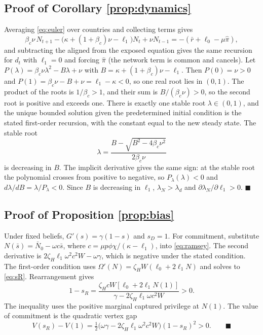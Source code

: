 \documentclass[11pt]{article}
\theoremstyle{definition}
\begin{document}
\subsection{Proof of Corollary \ref{prop:dynamics}}
Averaging \eqref{eq:euler} over countries and collecting terms gives
\[
\beta_c\nu\, N_{t+1} - \big(\kappa + (1+\beta_c)\nu - \ell_1\big) N_t + \nu N_{t-1} = -(\bar r + \ell_0 - \mu\hat\pi),
\]
and subtracting the aligned from the exposed equation gives the same recursion for $d_t$ with $\ell_1 = 0$ and forcing $\hat\pi$ (the network term is common and cancels). Let $P(\lambda) = \beta_c\nu\lambda^2 - B\lambda + \nu$ with $B = \kappa + (1+\beta_c)\nu - \ell_1$. Then $P(0) = \nu > 0$ and $P(1) = \beta_c\nu - B + \nu = \ell_1 - \kappa < 0$, so one real root lies in $(0,1)$. The product of the roots is $1/\beta_c > 1$, and their sum is $B/(\beta_c\nu) > 0$, so the second root is positive and exceeds one. There is exactly one stable root $\lambda \in (0,1)$, and the unique bounded solution given the predetermined initial condition is the stated first-order recursion, with the constant equal to the new steady state. The stable root
\[
\lambda = \frac{B - \sqrt{B^2 - 4\beta_c \nu^2}}{2\beta_c\nu}
\]
is decreasing in $B$. The implicit derivative gives the same sign: at the stable root the polynomial crosses from positive to negative, so $P_\lambda(\lambda) < 0$ and $d\lambda/dB = \lambda/P_\lambda < 0$. Since $B$ is decreasing in $\ell_1$, $\lambda_N > \lambda_d$ and $\partial\lambda_N/\partial\ell_1 > 0$. $\blacksquare$

\subsection{Proof of Proposition \ref{prop:bias}}
Under fixed beliefs, $G'(s)=\gamma(1-s)$ and $s_D=1$. For commitment, substitute $N(\bar s)=\bar N_0-\omega c\bar s$, where $c=\mu p\phi\chi/(\kappa-\ell_1)$, into \eqref{eq:ramsey}. The second derivative is $2\zeta_H\ell_1\omega^2c^2W-\omega\gamma$, which is negative under the stated condition. The first-order condition uses $\Omega'(N)=\zeta_HW(\ell_0+2\ell_1N)$ and solves to \eqref{eq:sR}. Rearrangement gives
\[
1-s_R=\frac{\zeta_HcW[\ell_0+2\ell_1N(1)]}{\gamma-2\zeta_H\ell_1\omega c^2W}>0.
\]
The inequality uses the positive marginal captured privilege at $N(1)$. The value of commitment is the quadratic vertex gap
\[
V(s_R)-V(1)=\tfrac12\big(\omega\gamma-2\zeta_H\ell_1\omega^2c^2W\big)(1-s_R)^2>0. \qquad\blacksquare
\]
\end{document}
